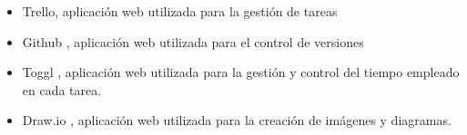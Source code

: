 \documentclass[11pt,a4paper,twoside,final]{article}
\begin{document}
\begin{itemize}
    \begin{itemize}
        \item Trello, aplicación web utilizada para la gestión de tareas
        \item Github \cite{github}, aplicación web utilizada para el control de versiones \cite{git}
        \item Toggl \cite{toggl}, aplicación web utilizada para la gestión y control del tiempo empleado en cada tarea.
        \item Draw.io \cite{drawio}, aplicación web utilizada para la creación de imágenes y diagramas. 
    \end{itemize}
\end{itemize}

\newpage
{} %

\nocite{*} %
\printbibliography[title=Bibliografía]
\end{document}
